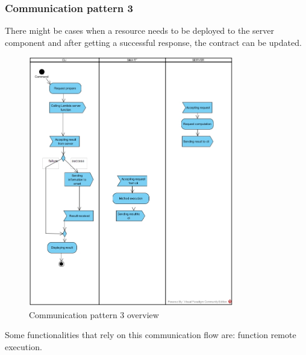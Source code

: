 \subsubsection{Communication pattern 3}
There might be cases when a resource needs to be deployed to the server component and after getting a successful response, the contract can be updated.
\begin{figure}[H]
	\centering
	\includegraphics[width=0.8\textwidth]{res/img/pattern3.jpg}
	\caption{Communication pattern 3 overview}
\end{figure}
\noindent Some functionalities that rely on this communication flow are: function remote execution. 